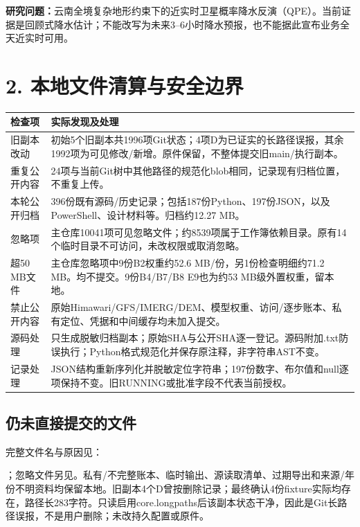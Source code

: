 \documentclass[UTF8,a4paper,10pt,fontset=none]{ctexart}
\newcommand{\key}[1]{\textcolor{ink}{\textbf{#1}}}
\begin{document}
\key{研究问题：}云南全境复杂地形约束下的近实时卫星概率降水反演（QPE）。当前证据是回顾式降水估计；不能改写为未来3--6小时降水预报，也不能据此宣布业务全天近实时可用。

\clearpage
\section*{2. 本地文件清算与安全边界}

\begin{center}\small
\begin{tabular}{@{}p{32mm}p{134mm}@{}}
\toprule
检查项 & 实际发现及处理 \\
\midrule
旧副本改动 & 初始5个旧副本共1996项Git状态；4项D为已证实的长路径误报，其余1992项为可见修改/新增。原件保留，不整体提交旧main/执行副本。 \\
重复公开内容 & 24项与当前Git树中其他路径的规范化blob相同，记录现有归档位置，不重复上传。 \\
本轮公开归档 & 396份既有源码/历史记录；包括187份Python、197份JSON，以及PowerShell、设计材料等。归档约12.27 MB。 \\
忽略项 & 主仓库10041项可见忽略文件；约8539项属于工作簿依赖目录。原有14个临时目录不可访问，未改权限或取消忽略。 \\
超50 MB文件 & 主仓库忽略项中9份B2权重约52.6 MB/份，另1份检查明细约71.2 MB。均不提交。9份B4/B7/B8 E9也为约53 MB级外置权重，留本地。 \\
禁止公开内容 & 原始Himawari/GFS/IMERG/DEM、模型权重、访问/逐步账本、私有定位、凭据和中间缓存均未加入提交。 \\
源码处理 & 只生成脱敏归档副本；原始SHA与公开SHA逐一登记。源码附加.txt防误执行；Python格式规范化并保存原注释，非字符串AST不变。 \\
记录处理 & JSON结构重新序列化并脱敏定位字符串；197份数字、布尔值和null逐项保持不变。旧RUNNING或批准字段不代表当前授权。 \\
\bottomrule
\end{tabular}\end{center}

\subsection*{仍未直接提交的文件}
完整文件名与原因见：\par{}；忽略文件另见。私有/不完整账本、临时输出、源读取清单、过期导出和来源/年份不明资料均保留本地。旧副本4个D曾按删除记录；最终确认4份fixture实际均存在，路径长283字符。只读启用core.longpaths后该副本状态干净，因此是Git长路径误报，不是用户删除；未改持久配置或原件。
\end{document}
